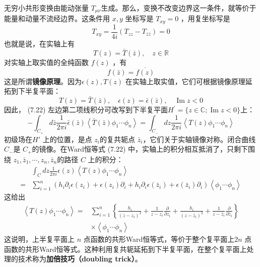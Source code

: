 无穷小共形变换由能动张量 $T_{\mu\nu} $生成。那么，变换不改变边界这一条件，就等价于能量和动量不流经边界。这条件用 $x,y$ 坐标写是 $T_{x y}=0$ ，用复坐标写是
\begin{equation}
	T_{x y}=\frac{1}{4 i}\left(T_{z z}-T_{\bar{z} \bar{z}}\right)=0 
\end{equation}
也就是说，在实轴上有
\begin{equation}
	T(z)=\bar{T}(\bar{z}), \quad z \in \mathbb{R}
\end{equation}
对实轴上取实值的全纯函数 $f(z)$ ，有
\begin{equation}
	f(\bar{z})=\overline{f(z)}
\end{equation} 
这是所谓\textbf{镜像原理}。因为$ \epsilon(z),T(z)$ 在实轴上取实值，它们可根据镜像原理延拓到下半复平面：
\begin{equation}
T(z)=\bar{T}(\bar{z}), \quad \epsilon(z)=\bar{\epsilon}(\bar{z}), \quad \operatorname{Im} z<0
\end{equation} 
因此， (7.22) 左边第二项线积分可改写到下半复平面$ H^{\prime}=\{z \in \mathbb{C}; \operatorname{Im} z<0\} $上：
$$
-\int_{C_{+}} d \bar{z} \frac{1}{2 \pi i} \bar{\epsilon}(\bar{z})\left\langle\bar{T}(\bar{z}) \phi_{1} \cdots \phi_{n}\right\rangle=\int_{C_{-}} d z \frac{1}{2 \pi i}\left\langle T(z) \phi_{1} \cdots \phi_{n}\right\rangle
$$
初级场在$ H'$ 上的位置，是点 $z_i $的复共轭点 $\bar{z}_{i} $，它们关于实轴镜像对称。闭合曲线 $C_- $是 $C_+ $的镜像。在Ward恒等式 (7.22) 中，实轴上的积分相互抵消了，只剩下围绕 $z_{1}, \bar{z}_{1}, \cdots, z_{n}, \bar{z}_{n} $的路径 $C$ 上的积分：
\begin{equation}
	\begin{aligned} & \int_{C} d z \frac{1}{2 \pi i} \epsilon(z)\left\langle T(z) \phi_{1} \cdots \phi_{n}\right\rangle \\ =&\sum_{i=1}^{n}\left(h_{i} \partial_{i} \epsilon\left(z_{i}\right)+\epsilon\left(z_{i}\right) \partial_{i}+h_{i} \partial_{i} \epsilon\left(\bar{z}_{i}\right)+\epsilon\left(\bar{z}_{i}\right) \partial_{i}\right)\left\langle\phi_{1} \cdots \phi_{n}\right\rangle \end{aligned}
\end{equation} 
这给出
\begin{equation}
	\begin{aligned} \left\langle T(z) \phi_{1} \cdots \phi_{n}\right\rangle=& \sum_{i=1}^{n}\left\{\frac{h_{i}}{\left(z-z_{i}\right)^{2}}+\frac{1}{z-z_{i}} \frac{\partial}{\partial z_{i}}+\frac{h_{i}}{\left(z-\bar{z}_{i}\right)^{2}}+\frac{1}{z-\bar{z}_{i}} \frac{\partial}{\partial \bar{z}_{i}}\right\} \\ & \times\left\langle\phi_{1} \cdots \phi_{n}\right\rangle \end{aligned}
\end{equation} 
这说明，上半复平面上 $n$ 点函数的共形Ward恒等式，等价于整个复平面上$ 2n$ 点函数的共形Ward恒等式。这种利用复共轭延拓到下半复平面，在整个复平面上处理的技术称为\textbf{加倍技巧（doubling trick）}。


